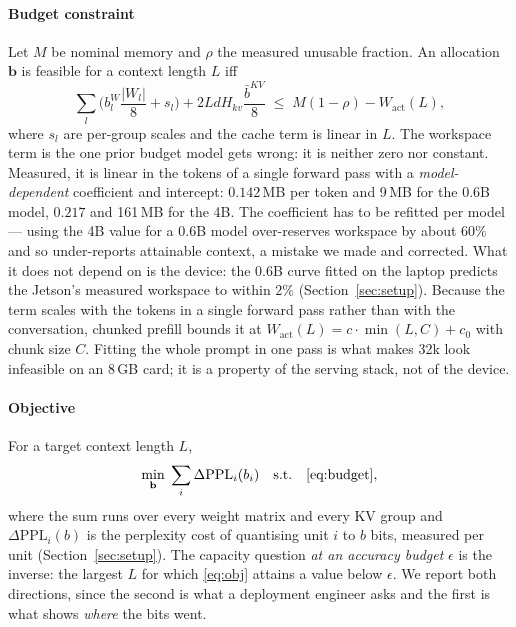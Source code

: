 \documentclass[5p]{elsarticle}
\newcommand{\rhoSym}{\rho}
\begin{document}
\paragraph*{Budget constraint}
Let $M$ be nominal memory and $\rhoSym$ the measured unusable fraction. An
allocation $\mathbf b$ is feasible for a context length $L$ iff
\begin{equation}
\sum_{l} \Big( b^{W}_l \frac{|W_l|}{8} + s_l \Big)
+ 2 L d H_{kv} \frac{\bar b^{KV}}{8}
\;\le\; M(1-\rhoSym) - W_{\mathrm{act}}(L),
\label{eq:budget}
\end{equation}
where $s_l$ are per-group scales and the cache term is linear in $L$. The
workspace term is the one prior budget model gets wrong: it is neither zero nor
constant. Measured, it is linear in the tokens of a single forward pass with a
\emph{model-dependent} coefficient and intercept: $0.142$\,MB per token and
9\,MB for the 0.6B model, $0.217$ and 161\,MB for the 4B. The coefficient has to
be refitted per model --- using the 4B value for a 0.6B model over-reserves
workspace by about $60\%$ and so under-reports attainable context, a mistake we
made and corrected. What it does not depend on is the device: the 0.6B curve
fitted on the laptop predicts the Jetson's measured workspace to within $2\%$
(Section~\ref{sec:setup}). Because the term scales with the tokens in a single
forward pass rather than with the conversation, chunked prefill bounds it at
$W_{\mathrm{act}}(L) = c \cdot \min(L, C) + c_0$ with chunk size $C$. Fitting the
whole prompt in one pass is what makes 32k look infeasible on an 8\,GB card; it
is a property of the serving stack, not of the device.

\paragraph*{Objective}
For a target context length $L$,
\begin{equation}
\min_{\mathbf b} \; \sum_i \Delta\mathrm{PPL}_i(b_i)
\quad \text{s.t.} \quad \eqref{eq:budget},
\label{eq:obj}
\end{equation}
where the sum runs over every weight matrix and every KV group and
$\Delta\mathrm{PPL}_i(b)$ is the perplexity cost of quantising unit $i$ to $b$
bits, measured per unit (Section~\ref{sec:setup}). The capacity question
\emph{at an accuracy budget} $\epsilon$ is the inverse: the largest $L$ for which
\eqref{eq:obj} attains a value below $\epsilon$. We report both directions, since
the second is what a deployment engineer asks and the first is what shows
\emph{where} the bits went.
\end{document}
